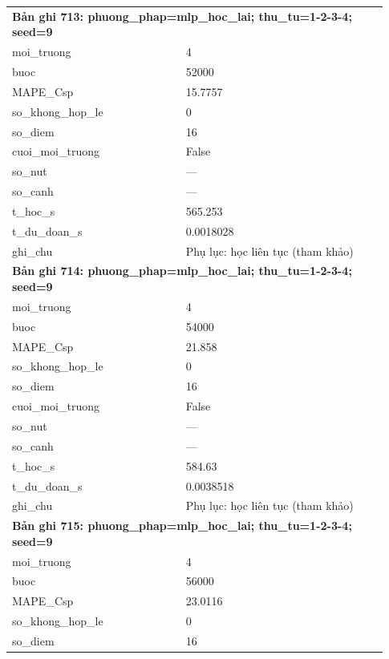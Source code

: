 \begin{longtable}{p{0.43\linewidth}p{0.50\linewidth}}
\midrule
\multicolumn{2}{p{0.95\linewidth}}{\textbf{Bản ghi 713: phuong\_phap=mlp\_hoc\_lai; thu\_tu=1-2-3-4; seed=9}} \\
moi\_\allowbreak truong & 4 \\
buoc & 52000 \\
MAPE\_\allowbreak Csp & 15.7757 \\
so\_\allowbreak khong\_\allowbreak hop\_\allowbreak le & 0 \\
so\_\allowbreak diem & 16 \\
cuoi\_\allowbreak moi\_\allowbreak truong & False \\
so\_\allowbreak nut & — \\
so\_\allowbreak canh & — \\
t\_\allowbreak hoc\_\allowbreak s & 565.253 \\
t\_\allowbreak du\_\allowbreak doan\_\allowbreak s & 0.0018028 \\
ghi\_\allowbreak chu & Phụ lục: học liên tục (tham khảo) \\
\midrule
\multicolumn{2}{p{0.95\linewidth}}{\textbf{Bản ghi 714: phuong\_phap=mlp\_hoc\_lai; thu\_tu=1-2-3-4; seed=9}} \\
moi\_\allowbreak truong & 4 \\
buoc & 54000 \\
MAPE\_\allowbreak Csp & 21.858 \\
so\_\allowbreak khong\_\allowbreak hop\_\allowbreak le & 0 \\
so\_\allowbreak diem & 16 \\
cuoi\_\allowbreak moi\_\allowbreak truong & False \\
so\_\allowbreak nut & — \\
so\_\allowbreak canh & — \\
t\_\allowbreak hoc\_\allowbreak s & 584.63 \\
t\_\allowbreak du\_\allowbreak doan\_\allowbreak s & 0.0038518 \\
ghi\_\allowbreak chu & Phụ lục: học liên tục (tham khảo) \\
\midrule
\multicolumn{2}{p{0.95\linewidth}}{\textbf{Bản ghi 715: phuong\_phap=mlp\_hoc\_lai; thu\_tu=1-2-3-4; seed=9}} \\
moi\_\allowbreak truong & 4 \\
buoc & 56000 \\
MAPE\_\allowbreak Csp & 23.0116 \\
so\_\allowbreak khong\_\allowbreak hop\_\allowbreak le & 0 \\
so\_\allowbreak diem & 16 \\

\end{longtable}
